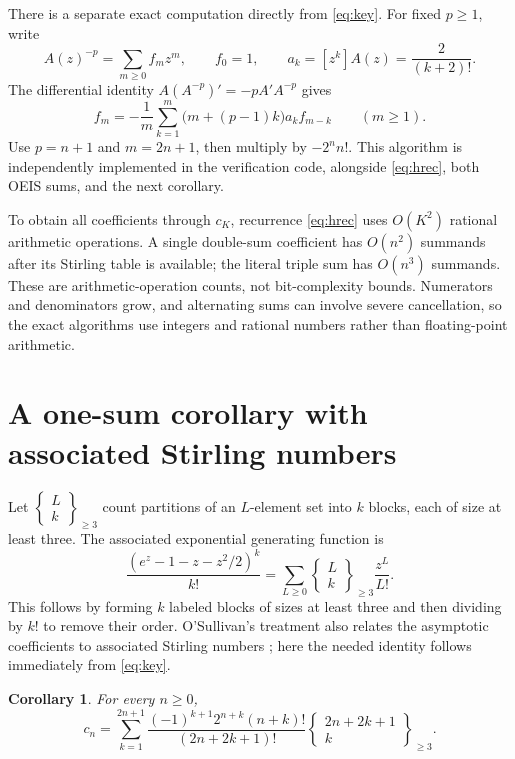 \documentclass[11pt,letterpaper]{article}
\numberwithin{equation}{section}
\newtheorem{corollary}[theorem]{Corollary}
\theoremstyle{remark}
\newcommand{\Sthree}[2]{\left\{\!\begin{matrix}#1\\#2\end{matrix}\!\right\}_{\geq 3}}
\begin{document}
There is a separate exact computation directly from \eqref{eq:key}.
For fixed $p\geq1$, write
\[
 A(z)^{-p}=\sum_{m\geq0}f_mz^m,\qquad f_0=1,
 \qquad a_k=[z^k]A(z)=\frac2{(k+2)!}.
\]
The differential identity $A(A^{-p})'=-pA'A^{-p}$ gives
\begin{equation}
 f_m=-\frac1m\sum_{k=1}^{m}
              \bigl(m+(p-1)k\bigr)a_kf_{m-k}
 \qquad(m\geq1).
 \label{eq:powerrec}
\end{equation}
Use $p=n+1$ and $m=2n+1$, then multiply by $-2^nn!$.
This algorithm is independently implemented in the verification code,
alongside \eqref{eq:hrec}, both OEIS sums, and the next corollary.

To obtain all coefficients through $c_K$, recurrence \eqref{eq:hrec}
uses $O(K^2)$ rational arithmetic operations. A single double-sum
coefficient has $O(n^2)$ summands after its Stirling table is available;
the literal triple sum has $O(n^3)$ summands. These are arithmetic-operation
counts, not bit-complexity bounds. Numerators and denominators grow, and
alternating sums can involve severe cancellation, so the exact algorithms
use integers and rational numbers rather than floating-point arithmetic.

\section{A one-sum corollary with associated Stirling numbers}
\label{sec:associated}

Let $\Sthree{L}{k}$ count partitions of an $L$-element set into $k$ blocks,
each of size at least three. The associated exponential generating
function is
\begin{equation}
 \frac{(e^z-1-z-z^2/2)^k}{k!}
 =\sum_{L\geq0}\Sthree{L}{k}\frac{z^L}{L!}.
 \label{eq:associated-egf}
\end{equation}
This follows by forming $k$ labeled blocks of sizes at least three and
then dividing by $k!$ to remove their order. O'Sullivan's treatment also
relates the asymptotic coefficients to associated Stirling numbers
\cite{osullivan}; here the needed identity follows immediately from
\eqref{eq:key}.

\begin{corollary}
\label{cor:associated}
For every $n\geq0$,
\begin{equation}
 c_n=\sum_{k=1}^{2n+1}
       \frac{(-1)^{k+1}2^{n+k}(n+k)!}
            {(2n+2k+1)!}
       \Sthree{2n+2k+1}{k}.
 \label{eq:associated}
\end{equation}
\end{corollary}
\end{document}
